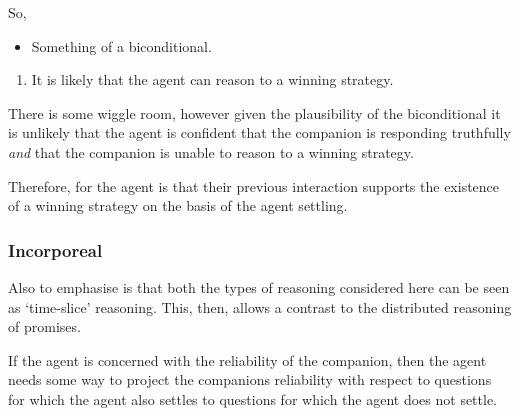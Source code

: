 \documentclass[10pt]{article}
\begin{document}
So,

\begin{itemize}
\item Something of a biconditional.
\end{itemize}



\begin{enumerate}[label=(C\arabic*)]
\item It is likely that the agent can reason to a winning strategy.
\end{enumerate}

There is some wiggle room, however given the plausibility of the biconditional it is unlikely that the agent is confident that the companion is responding truthfully \emph{and} that the companion is unable to reason to a winning strategy.




Therefore, for the agent is that their previous interaction supports the existence of a winning strategy on the basis of the agent settling.




\subsubsection{Incorporeal}
\label{sec:incorporeal}

\begin{note}
  Also to emphasise is that both the types of reasoning considered here can be seen as `time-slice' reasoning.
  This, then, allows a contrast to the distributed reasoning of promises.
\end{note}

If the agent is concerned with the reliability of the companion, then the agent needs some way to project the companions reliability with respect to questions for which the agent also settles to questions for which the agent does not settle.
\end{document}
